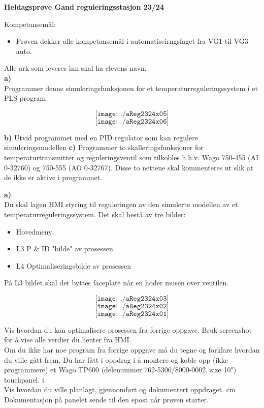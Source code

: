 
\huge
\centerline{\bf Heldagsprøve Gand reguleringsstasjon 23/24}  \bigskip
\normalsize
\vskip 1cm 
Kompetansemål:
\begin{itemize}[noitemsep]

	\item Prøven dekker alle kompetansemål i automatiseirngsfaget fra VG1 til VG3 auto.  
\end{itemize}

Alle ark som leveres inn skal ha elevens navn. \\ 

\newpage
\vskip 5pt 
\oppgave{}%
\textbf{a)}\\
Programmer denne simuleringsfunksjonen for et temperaturreguleringssystem i et PLS program
\vskip 1cm 

$$\texttt{[image: ./aReg2324x05]}$$
$$\texttt{[image: ./aReg2324x06]}$$

\textbf{b)}
Utvid programmet med en PID regulator som kan regulere simuleringsmodellen
\vskip 1cm 
\textbf{c)}
Programmer to skalleringsfunksjoner for temperaturtransmitter og reguleringsventil som tilkobles h.h.v. Wago 750-455 (AI 0-32760) og 750-555 (AO 0-32767). Disse to nettene skal kommenteres ut slik at de ikke er aktive i programmet. 
\vskip 1cm 

\oppgave{}%
\textbf{a)}\\
\vskip 1cm 
Du skal lagen HMI styring til reguleringen av den simulerte modellen av et temperaturreguleringssystem. Det skal bestå av tre bilder:
\begin{itemize}
	\item Hovedmeny
	\item L3 P \& ID "bilde" av prosessen
	\item L4 Optimaliseringsbilde av prosessen
\end{itemize}

På L3 bildet skal det byttes faceplate når en hoder musen over ventilen. 


$$\texttt{[image: ./aReg2324x03]}$$
$$\texttt{[image: ./aReg2324x02]}$$
$$\texttt{[image: ./aReg2324x01]}$$

\vskip 2cm
\oppgave{}%
Vis hvordan du kan optimalisere prosessen fra forrige oppgave. Bruk screenshot for å vise alle verdier du henter fra HMI. \\
Om du ikke har noe program fra forrige oppgave må du tegne og forklare hvordan du ville gått frem. 
\vskip 2cm
\oppgave{}%
Du har fått i oppdrag i å montere og koble opp (ikke programmere) et Wago TP600 (delenummer 762-5306/8000-0002, size 10") touchpanel. i\\
Vis hvordan du ville planlagt, gjennomført og dokumentert oppdraget.
 cm 
Dokumentasjon på panelet sende til den epost når prøven starter. 

%

